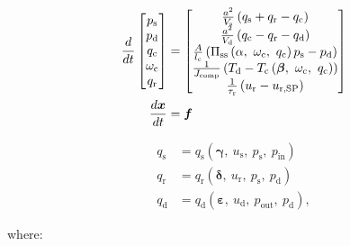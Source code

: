 \begin{equation}
  \begin{split}
    \dt{} \begin{bmatrix}
      p_\text{s}\\
      p_\text{d}\\
      q_\text{c}\\
      \omega_\text{c}\\
      q_\text{r}
    \end{bmatrix} & =
    \begin{bmatrix}
      \frac{a^2}{V_\text{s}}\left(q_\text{s}+q_\text{r}-q_\text{c}\right)\\
      \frac{a^2}{V_\text{d}}\left(q_\text{c}-q_\text{r}-q_\text{d}\right)\\
      \frac{A}{l_\text{c}}\left(\Pi_{\text{ss}}\left(\alpha,\ \omega_\text{c},\ q_\text{c} \right)p_\text{s} - p_\text{d}  \right)\\
      \frac{1}{J\ut{comp}}\left(T_\text{d} - T_\text{c}\left(\bm{\beta},\ \omega_\text{c},\ q_\text{c}\right)\right)\\
      \frac{1}{\tau_\text{r}}\left(u_\text{r} - u_{\text{r,SP}}\right)
    \end{bmatrix} \\
    \dt{\bm{x}} & = \bm{f}
  \end{split}
  \label{eq:mod:single_comp_states}
\end{equation}

\begin{equation}
  \begin{split}
    q_\text{s} & = q_\text{s}(\bm{\gamma},\ u_{\text{s}},\ p_\text{s},\ p_{\text{in}})\\
    q_\text{r} & = q_\text{r}(\bm{\delta},\ u_\text{r},\ p_\text{s},\ p_\text{d})\\
    q_\text{d} & = q_\text{d}(\bm{\varepsilon},\ u_{\text{d}},\ p_{\text{out}},\ p_\text{d}),
  \end{split}
\end{equation}


where:

